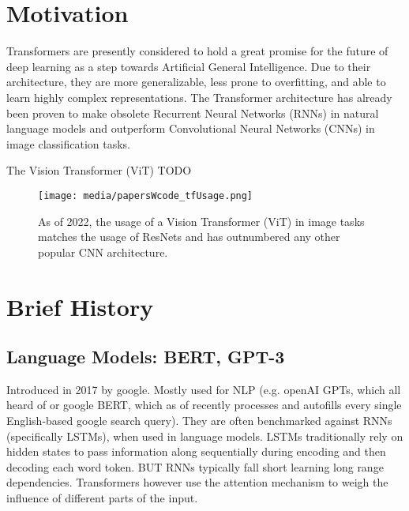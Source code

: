 
\section{Motivation}

Transformers are presently considered to hold a great promise for the future of deep learning
as a step towards Artificial General Intelligence.
Due to their architecture, they are more generalizable, less prone to overfitting, and able 
to learn highly complex representations. The Transformer architecture has already been proven 
to make obsolete Recurrent Neural Networks (RNNs) in natural language models and outperform
Convolutional Neural Networks (CNNs) in image classification tasks.

The Vision Transformer (ViT) TODO


\begin{figure}[H]
	\begin{center}
	\texttt{[image: media/papersWcode\_tfUsage.png]}
	\end{center}
	\caption[Historical Usage of ViT in Image Tasks]{As of 2022, the usage of a Vision Transformer (ViT) in image 
	tasks matches the usage of ResNets and has outnumbered any other popular CNN architecture.
	\citep{PapersOverTime}}
	\end{figure}


\section{Brief History}

\subsection{Language Models: BERT, GPT-3}

Introduced in 2017 by google. Mostly used for NLP (e.g. openAI GPTs, 
which all heard of or google BERT, which as of recently processes 
and autofills every single English-based google search query). 
They are often benchmarked against RNNs (specifically LSTMs), when used in 
language models. LSTMs traditionally rely on hidden states to pass information 
along sequentially during encoding and then decoding each word token. BUT RNNs 
typically fall short learning long range dependencies.
Transformers however use the attention mechanism to weigh the influence of 
different parts of the input.


